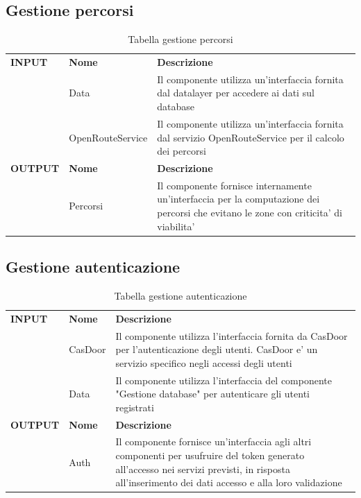\documentclass{article}
\begin{document}
\clearpage

\subsection{Gestione percorsi}

\begin{table}[htbp]
    \centering
    \renewcommand{\arraystretch}{1.5} %
    \begin{tabularx}{\textwidth}{| l | l | X |}
        \Xhline{2pt}
        \textbf{INPUT} & \textbf{Nome} & \textbf{Descrizione} \\
        \Xhline{2pt}
         & Data & Il componente utilizza un'interfaccia fornita dal datalayer per accedere ai dati sul database  \\
        \hline
         & OpenRouteService & Il componente utilizza un'interfaccia fornita dal servizio OpenRouteService per il calcolo dei percorsi \\
         \Xhline{2pt}
        \textbf{OUTPUT} & \textbf{Nome} & \textbf{Descrizione} \\
        \Xhline{2pt}
         & Percorsi & Il componente fornisce internamente un'interfaccia per la computazione dei percorsi che evitano le zone con criticita' di viabilita' \\
        \hline
    \end{tabularx}
    \caption{Tabella gestione percorsi}
\end{table}

\subsection{Gestione autenticazione}

\begin{table}[htbp]
    \centering
    \renewcommand{\arraystretch}{1.5} %
    \begin{tabularx}{\textwidth}{| l | l | X |}
        \Xhline{2pt}
        \textbf{INPUT} & \textbf{Nome} & \textbf{Descrizione} \\
        \Xhline{2pt}
         & CasDoor & Il componente utilizza l'interfaccia fornita da CasDoor per l'autenticazione degli utenti. CasDoor e' un servizio specifico negli accessi degli utenti \\
        \hline
         & Data & Il componente utilizza l’interfaccia del componente "Gestione database" per autenticare gli utenti registrati \\
        \Xhline{2pt}
        \textbf{OUTPUT} & \textbf{Nome} & \textbf{Descrizione} \\
        \Xhline{2pt}
         & Auth & Il componente fornisce un'interfaccia agli altri componenti per usufruire del token generato all'accesso nei servizi previsti, in risposta all’inserimento dei dati accesso e alla loro validazione \\
        \hline
    \end{tabularx}
    \caption{Tabella gestione autenticazione}
\end{table}
\end{document}
